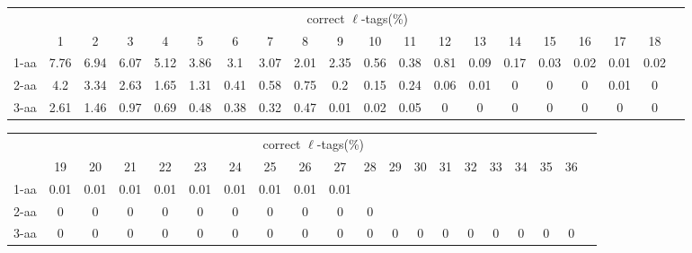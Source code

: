 \documentclass{article}[12pt]
\begin{document}
\begin{landscape}

\begin{table}[h]\tiny
\vspace{3mm}
{\centering
\begin{center}
\begin{tabular}{|l|c|c|c|c|c|c|c|c|c|c|c|c|c|c|c|c|c|c|c|}
  \hline
  & \multicolumn{ 18 }{|c|}{correct $\ell$-tags(\%)} \\
  \cline{2- 19}
    & 1 & 2 & 3 & 4 & 5 & 6 & 7 & 8 & 9 & 10 & 11 & 12 & 13 & 14 & 15 & 16 & 17 & 18\\
  \hline
1-aa  & 7.76 & 6.94 & 6.07 & 5.12 & 3.86 & 3.1 & 3.07 & 2.01 & 2.35 & 0.56 & 0.38 & 0.81 & 0.09 & 0.17 & 0.03 & 0.02 & 0.01 & 0.02\\
2-aa  & 4.2 & 3.34 & 2.63 & 1.65 & 1.31 & 0.41 & 0.58 & 0.75 & 0.2 & 0.15 & 0.24 & 0.06 & 0.01 & 0 & 0 & 0 & 0.01 & 0\\
3-aa  & 2.61 & 1.46 & 0.97 & 0.69 & 0.48 & 0.38 & 0.32 & 0.47 & 0.01 & 0.02 & 0.05 & 0 & 0 & 0 & 0 & 0 & 0 & 0\\
 \hline
\end{tabular}
\end{center}
\par}
\centering

\vspace{3mm}
\end{table}
\begin{table}[h]\tiny
\vspace{3mm}
{\centering
\begin{center}
\begin{tabular}{|l|c|c|c|c|c|c|c|c|c|c|c|c|c|c|c|c|c|c|c|}
  \hline
  & \multicolumn{ 18 }{|c|}{correct $\ell$-tags(\%)} \\
  \cline{2- 19}
    & 19 & 20 & 21 & 22 & 23 & 24 & 25 & 26 & 27 & 28 & 29 & 30 & 31 & 32 & 33 & 34 & 35 & 36\\
  \hline
1-aa  & 0.01 & 0.01 & 0.01 & 0.01 & 0.01 & 0.01 & 0.01 & 0.01 & 0.01 &  &  &  &  &  &  &  &  & \\
2-aa  & 0 & 0 & 0 & 0 & 0 & 0 & 0 & 0 & 0 & 0 &  &  &  &  &  &  &  & \\
3-aa  & 0 & 0 & 0 & 0 & 0 & 0 & 0 & 0 & 0 & 0 & 0 & 0 & 0 & 0 & 0 & 0 & 0 & 0\\
 \hline
\end{tabular}
\end{center}
\par}
\centering


\end{table}
\end{landscape}
\end{document}
